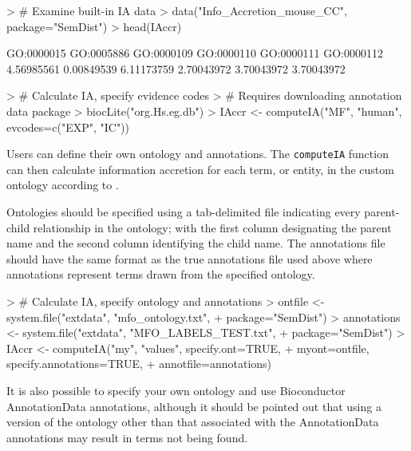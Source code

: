\documentclass{article}
\begin{document}
\begin{Schunk}
\begin{Sinput}
> # Examine built-in IA data
> data("Info_Accretion_mouse_CC", package="SemDist")
> head(IAccr)
\end{Sinput}
\begin{Soutput}
GO:0000015 GO:0005886 GO:0000109 GO:0000110 GO:0000111 GO:0000112 
4.56985561 0.00849539 6.11173759 2.70043972 3.70043972 3.70043972 
\end{Soutput}
\end{Schunk}
\begin{Schunk}
\begin{Sinput}
> # Calculate IA, specify evidence codes
> # Requires downloading annotation data package
> biocLite("org.Hs.eg.db")
> IAccr <- computeIA("MF", "human", evcodes=c("EXP", "IC"))
\end{Sinput}
\end{Schunk}

Users can define their own ontology and annotations.  The \texttt{computeIA} function can then calculate information accretion for each term, or entity, in the custom ontology according to .

Ontologies should be specified using a tab-delimited file indicating every parent-child relationship in the ontology; with the first column designating the parent name and the second column identifying the child name. The annotations file should have the same format as the true annotations file used above where annotations represent terms drawn from the specified ontology.  

\begin{Schunk}
\begin{Sinput}
> # Calculate IA, specify ontology and annotations
> ontfile <- system.file("extdata", "mfo_ontology.txt",
+                         package="SemDist")
> annotations <- system.file("extdata", "MFO_LABELS_TEST.txt", 
+                             package="SemDist")
> IAccr <- computeIA("my", "values", specify.ont=TRUE, 
+                 myont=ontfile, specify.annotations=TRUE, 
+                 annotfile=annotations)
\end{Sinput}
\end{Schunk}


It is also possible to specify your own ontology and use Bioconductor AnnotationData annotations, although it should be pointed out that using a version of the ontology other than that associated with the AnnotationData annotations may result in terms not being found. 
\end{document}

